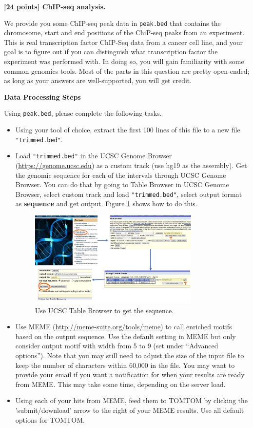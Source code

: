 {\bf [24 points] ChIP-seq analysis.}
\vspace{2mm}

We provide you some ChIP-seq peak data in \texttt{peak.bed} that contains the chromosome, start and end positions of the ChiP-seq peaks from an experiment. This is real transcription factor ChIP-Seq data from a cancer cell line, and your goal is to figure out if you can distinguish what transcription factor the experiment was performed with. In doing so, you will gain familiarity with some common genomics tools.
Most of the parts in this question are pretty open-ended; as long as your answers are well-supported, you will get credit.

\textbf{Data Processing Steps}

Using \texttt{peak.bed}, please complete the following tasks.
\begin{itemize}
\item Using your tool of choice, extract the first 100 lines of this file to a new file \texttt{"trimmed.bed"}.
\item 

        Load \texttt{"trimmed.bed"} in the UCSC Genome Browser (\url{https://genome.ucsc.edu}) as a custom track (use hg19 as the assembly). Get the genomic sequence for each of the intervals through UCSC Genome Browser. You can do that by going to Table Browser in UCSC Genome Browser, select custom track and load \texttt{"trimmed.bed"}, select output format as \textbf{sequence} and get output. Figure \ref{fig:genomebrowser} shows how to do this.

\begin{figure}[h]
\centering
\includegraphics[width=0.8\textwidth]{tuts}
\caption{Use UCSC Table Browser to get the sequence.}
\label{fig:genomebrowser}
\end{figure}
    \item Use MEME (\url{http://meme-suite.org/tools/meme}) to call enriched motifs based on the output sequence. Use the default setting in MEME but only consider output motif with width from 5 to 9 (set under ``Advanced options''). Note that you may still need to adjust the size of the input file to keep the number of characters within 60,000 in the file. You may want to provide your email if you want a notification for when your results are ready from MEME. This may take some time, depending on the server load.
    \item Using each of your hits from MEME, feed them to TOMTOM by clicking the 'submit/download' arrow to the right of your MEME results. Use all default options for TOMTOM.
\end{itemize}



